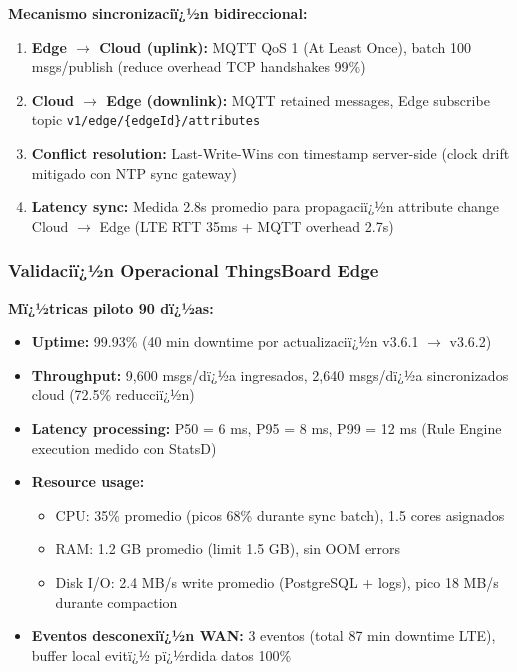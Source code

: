 \textbf{Mecanismo sincronizaciï¿½n bidireccional:}

\begin{enumerate}
    \item \textbf{Edge $\rightarrow$ Cloud (uplink):} MQTT QoS 1 (At Least Once), batch 100 msgs/publish (reduce overhead TCP handshakes 99\%)
    \item \textbf{Cloud $\rightarrow$ Edge (downlink):} MQTT retained messages, Edge subscribe topic \texttt{v1/edge/\{edgeId\}/attributes}
    \item \textbf{Conflict resolution:} Last-Write-Wins con timestamp server-side (clock drift mitigado con NTP sync gateway)
    \item \textbf{Latency sync:} Medida 2.8s promedio para propagaciï¿½n attribute change Cloud $\rightarrow$ Edge (LTE RTT 35ms + MQTT overhead 2.7s)
\end{enumerate}

\subsubsection{Validaciï¿½n Operacional ThingsBoard Edge}

\textbf{Mï¿½tricas piloto 90 dï¿½as:}

\begin{itemize}
    \item \textbf{Uptime:} 99.93\% (40 min downtime por actualizaciï¿½n v3.6.1 $\rightarrow$ v3.6.2)
    \item \textbf{Throughput:} 9,600 msgs/dï¿½a ingresados, 2,640 msgs/dï¿½a sincronizados cloud (72.5\% reducciï¿½n)
    \item \textbf{Latency processing:} P50 = 6 ms, P95 = 8 ms, P99 = 12 ms (Rule Engine execution medido con StatsD)
    \item \textbf{Resource usage:}
    \begin{itemize}
        \item CPU: 35\% promedio (picos 68\% durante sync batch), 1.5 cores asignados
        \item RAM: 1.2 GB promedio (limit 1.5 GB), sin OOM errors
        \item Disk I/O: 2.4 MB/s write promedio (PostgreSQL + logs), pico 18 MB/s durante compaction
    \end{itemize}
    \item \textbf{Eventos desconexiï¿½n WAN:} 3 eventos (total 87 min downtime LTE), buffer local evitï¿½ pï¿½rdida datos 100\%
\end{itemize}

